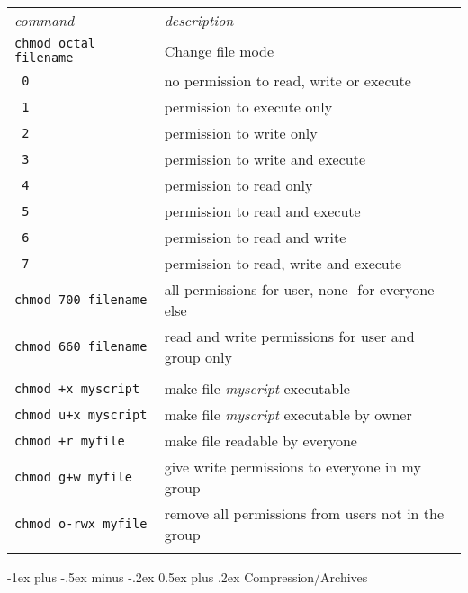 \documentclass[10pt,landscape]{article}
\makeatletter
\renewcommand{\section}{\@startsection{section}{1}{0mm}%
                                {-1ex plus -.5ex minus -.2ex}%
                                {0.5ex plus .2ex}%
                                {\normalfont\large\bfseries}}
\makeatother
\begin{document}
\begin{multicols}{2}
\begin{tabular}{ll}
\emph{command} & \emph{description} \\
\texttt{chmod octal filename} & Change file mode \\
\texttt{\hspace*{8mm} 0 } & no permission to read, write or execute \\
\texttt{\hspace*{8mm} 1 } & permission to execute only \\
\texttt{\hspace*{8mm} 2 } & permission to write only \\
\texttt{\hspace*{8mm} 3 } & permission to write and execute \\
\texttt{\hspace*{8mm} 4 } & permission to read only \\
\texttt{\hspace*{8mm} 5 } & permission to read and execute \\
\texttt{\hspace*{8mm} 6 } & permission to read and write \\
\texttt{\hspace*{8mm} 7 } & permission to read, write and execute \\
\texttt{chmod 700 filename } & all permissions for user, none- for everyone else \\
\texttt{chmod 660 filename } & read and write permissions for user and group only \\\\
\texttt{chmod +x myscript} & make file \textit{myscript} executable \\
\texttt{chmod u+x myscript} & make file \textit{myscript} executable by owner \\
\texttt{chmod +r myfile} & make file readable by everyone \\
\texttt{chmod g+w myfile} & give write permissions to everyone in my group \\
\texttt{chmod o-rwx myfile} & remove all permissions from users not in the group \\

\\
\end{tabular}

\section{Compression/Archives}
\begin{tabular}{ll}


\end{tabular}
\end{multicols}
\end{document}
